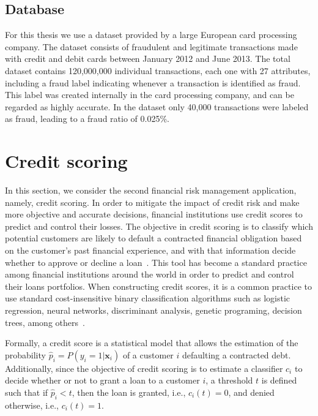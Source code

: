 	\subsection{Database}

 	For this thesis we use a dataset provided by a large European card processing company. The 
	dataset consists of fraudulent and legitimate transactions made with credit and debit cards 
	between January 2012 and June 2013. The total dataset contains 120,000,000 individual 
	transactions, each one with 27 attributes, including a fraud label indicating whenever a 
	transaction is identified as fraud. This label was created internally in the card processing 
	company, and can be regarded as highly accurate. In the dataset only 40,000 transactions were 
	labeled as fraud, leading to a fraud ratio of 0.025\%. 

	
\section{Credit scoring}
\label{sec:4:creditscoring}

  In this section, we consider the second financial risk management application, namely, credit 
  scoring.
  In order to mitigate the impact of credit risk and make more objective and accurate decisions, 
  financial institutions use credit scores to predict and control their losses.
  The objective in credit scoring is to classify which potential customers are likely to default a 
  contracted financial obligation based on the customer's past financial experience, and with that 
  information decide whether to approve or decline a loan~\citep{Anderson2007}. This tool has 
  become a standard practice among financial institutions around the world in order to predict 
  and control their loans portfolios. When constructing credit scores, it is a common practice to 
  use standard cost-insensitive binary classification algorithms such as logistic regression, 
  neural networks, discriminant analysis, genetic programing, decision trees, among 
  others~\citep{Hand1997,Bahnsen2011}. 
  
  Formally, a credit score is a statistical model that allows the estimation of the probability 
  $\hat p_i=P(y_i=1|\mathbf{x}_i)$ of a customer $i$ defaulting a contracted debt. Additionally, 
since the 
  objective of credit scoring is to estimate a classifier $c_i$ to decide whether or not to grant a 
  loan to a customer $i$, a threshold $t$ is defined such that if $\hat p_i <t$, then the loan is 
  granted, i.e., $c_i(t)=0$, and denied otherwise, i.e., $c_i(t)=1$.
  
